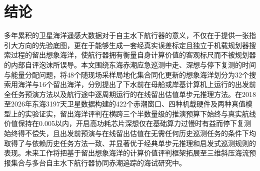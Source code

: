 \section{结论}

多年累积的卫星海洋遥感大数据对于自主水下航行器的意义，不仅在于提供一张指引大方向的先验底图，更在于能够生成一套经真实误差标定且独立于机载规划器搜索过程的留出想象海洋，使航行器拥有衡量自身计算价值的客观标尺而不被规划器的内部自评泡沫所误导。本文围绕东海赤潮应急巡测中走、深想与停下复测的时间与能量分配问题，将48个随现场采样局地化集合同化更新的想象海洋划分为32个搜索用海洋与16个留出海洋，分别提出了下水前在母船或岸基计算机上运行的出发前全任务预演方法以及航行途中逐周期运行的在线留出估值单步元推理方法。在2018至2026年东海3197天卫星数据构建的422个赤潮窗口、四种机载硬件及两种真值模型上的实验证实，留出海洋评判在横跨三个半数量级的推演预算下始终与真实航线价值保持在0.005以内，开启高功耗芯片深想仅在基础算力过慢时有益而停下复测始终得不偿失，且出发前预演与在线留出估值在无需任何历史巡测任务的条件下均取得了与依赖历史任务方法一致、并显著优于经典单步元推理和启发式巡测规则的表现。未来工作将把基于留出想象海洋的计算价值评判框架拓展至三维斜压海流预报集合与多台自主水下航行器协同赤潮追踪的海试研究中。
